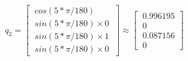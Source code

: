 \documentclass[preview]{standalone}
\begin{document}
\begin{center}
$q_2 = \begin{bmatrix}\
                    cos(5*\pi/180) \\\
                    sin(5*\pi/180) \times 0 \\\
                    sin(5*\pi/180) \times 1 \\\
                    sin(5*\pi/180) \times 0\
                \end{bmatrix} \approx \begin{bmatrix}\
                    0.996195 \\\
                    0 \\\
                    0.087156 \\\
                    0\
                \end{bmatrix}$
\end{center}
\end{document}
